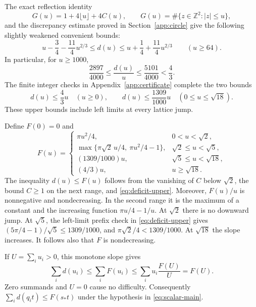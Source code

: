 \documentclass[11pt,reqno]{amsart}
\numberwithin{equation}{section}
\newcommand{\Z}{\mathbb Z}
\newcommand{\abs}[1]{\lvert#1\rvert}
\newcommand{\sstar}{s_*}
\begin{document}
The exact reflection identity
\begin{equation}\label{eq:reflection}
 G(u)=1+4\lfloor u\rfloor+4C(u),\qquad
 G(u)=\#\{z\in\Z^2:\abs z\le u\},
\end{equation}
and the discrepancy estimate proved in Section~\ref{app:circle}
give the following slightly weakened convenient bounds:
\begin{equation}\label{eq:deficit-tail}
 u-\frac34-\frac{11}{4}u^{2/3}\le d(u)
 \le u+\frac14+\frac{11}{4}u^{2/3}\qquad(u\ge64).
\end{equation}
In particular, for $u\ge1000$,
\begin{equation}\label{eq:thousand}
 \frac{2897}{4000}\le\frac{d(u)}u
 \le\frac{5101}{4000}<\frac43.
\end{equation}
The finite integer checks in Appendix~\ref{app:certificate}
complete the two bounds
\begin{equation}\label{eq:deficit-upper}
 d(u)\le\frac43u\quad(u\ge0),\qquad
 d(u)\le\frac{1309}{1000}u\quad(0\le u\le\sqrt{18}).
\end{equation}
These upper bounds include left limits at every lattice jump.

Define $F(0)=0$ and
\begin{equation}\label{eq:envelope}
 F(u)=
 \begin{cases}
 \pi u^2/4,&0<u<\sqrt2,\\
 \max\{\pi\sqrt2\,u/4,\ \pi u^2/4-1\},
        &\sqrt2\le u<\sqrt5,\\
 (1309/1000)u,&\sqrt5\le u<\sqrt{18},\\
 (4/3)u,&u\ge\sqrt{18}.
 \end{cases}
\end{equation}
The inequality $d(u)\le F(u)$ follows from the vanishing of $C$
below $\sqrt2$, the bound $C\ge1$ on the next range, and
\eqref{eq:deficit-upper}. Moreover, $F(u)/u$ is nonnegative
and nondecreasing. In the second range it is the maximum of a
constant and the increasing function $\pi u/4-1/u$.
At $\sqrt2$ there is no downward jump. At $\sqrt5$, the
left-limit prefix check in \eqref{eq:deficit-upper} gives
$(5\pi/4-1)/\sqrt5\le1309/1000$, and
$\pi\sqrt2/4<1309/1000$. At $\sqrt{18}$ the slope increases.
It follows also that $F$ is nondecreasing.

If $U=\sum_i u_i>0$, this monotone slope gives
\begin{equation}\label{eq:aggregate-envelope}
 \sum_i d(u_i)\le\sum_iF(u_i)
 \le\sum_i u_i\frac{F(U)}U=F(U).
\end{equation}
Zero summands and $U=0$ cause no difficulty. Consequently
$\sum_i d(q_it)\le F(\sstar t)$ under the hypothesis in
\eqref{eq:scalar-main}.
\end{document}
